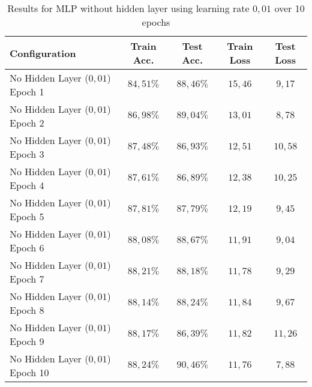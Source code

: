 \documentclass[a4paper]{article}
\begin{document}
\begin{table}[h!]
\centering
\begin{tabular}{|l|c|c|c|c|}
\hline
\textbf{Configuration} & \textbf{Train Acc.} & \textbf{Test Acc.} & \textbf{Train Loss} & \textbf{Test Loss} \\
\hline
No Hidden Layer ($0{,}01$) Epoch 1 & $84{,}51\%$ & $88{,}46\%$ & $15{,}46$ & $9{,}17$ \\
No Hidden Layer ($0{,}01$) Epoch 2 & $86{,}98\%$ & $89{,}04\%$ & $13{,}01$ & $8{,}78$ \\
No Hidden Layer ($0{,}01$) Epoch 3 & $87{,}48\%$ & $86{,}93\%$ & $12{,}51$ & $10{,}58$ \\
No Hidden Layer ($0{,}01$) Epoch 4 & $87{,}61\%$ & $86{,}89\%$ & $12{,}38$ & $10{,}25$ \\
No Hidden Layer ($0{,}01$) Epoch 5 & $87{,}81\%$ & $87{,}79\%$ & $12{,}19$ & $9{,}45$ \\
No Hidden Layer ($0{,}01$) Epoch 6 & $88{,}08\%$ & $88{,}67\%$ & $11{,}91$ & $9{,}04$ \\
No Hidden Layer ($0{,}01$) Epoch 7 & $88{,}21\%$ & $88{,}18\%$ & $11{,}78$ & $9{,}29$ \\
No Hidden Layer ($0{,}01$) Epoch 8 & $88{,}14\%$ & $88{,}24\%$ & $11{,}84$ & $9{,}67$ \\
No Hidden Layer ($0{,}01$) Epoch 9 & $88{,}17\%$ & $86{,}39\%$ & $11{,}82$ & $11{,}26$ \\
No Hidden Layer ($0{,}01$) Epoch 10 & $88{,}24\%$ & $90{,}46\%$ & $11{,}76$ & $7{,}88$ \\
\hline
\end{tabular}
\caption{Results for MLP without hidden layer using learning rate $0{,}01$ over 10 epochs}
\label{tab:no_hidden_01_results}
\end{table}
\end{document}

